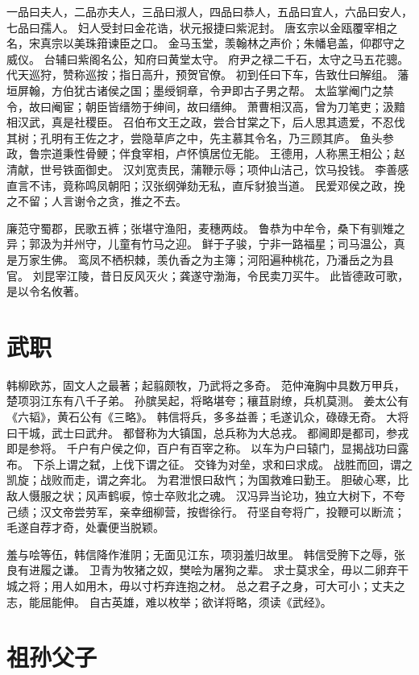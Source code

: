 \documentclass[12pt,UTF8]{ctexbook}
\begin{document}
一品曰夫人，二品亦夫人，三品曰淑人，四品曰恭人，五品曰宜人，六品曰安人，七品曰孺人。
妇人受封曰金花诰，状元报捷曰紫泥封。
唐玄宗以金瓯覆宰相之名，宋真宗以美珠箝谏臣之口。
金马玉堂，羡翰林之声价；朱幡皂盖，仰郡守之威仪。
台辅曰紫阁名公，知府曰黄堂太守。
府尹之禄二千石，太守之马五花骢。
代天巡狩，赞称巡按；指日高升，预贺官僚。
初到任曰下车，告致仕曰解组。
藩垣屏翰，方伯犹古诸侯之国；墨绶铜章，令尹即古子男之帮。
太监掌阉门之禁令，故曰阉宦；朝臣皆缙笏于绅间，故曰缙绅。
萧曹相汉高，曾为刀笔吏；汲黯相汉武，真是社稷臣。
召伯布文王之政，尝合甘棠之下，后人思其遗爱，不忍伐其树；孔明有王佐之才，尝隐草庐之中，先主慕其令名，乃三顾其庐。
鱼头参政，鲁宗道秉性骨鲠；伴食宰相，卢怀慎居位无能。
王德用，人称黑王相公；赵清献，世号铁面御史。
汉刘宽责民，蒲鞭示辱；项仲山洁己，饮马投钱。
李善感直言不讳，竟称鸣凤朝阳；汉张纲弹劾无私，直斥豺狼当道。
民爱邓侯之政，挽之不留；人言谢令之贪，推之不去。

廉范守蜀郡，民歌五裤；张堪守渔阳，麦穗两歧。
鲁恭为中牟令，桑下有驯雉之异；郭汲为并州守，儿童有竹马之迎。
鲜于子骏，宁非一路福星；司马温公，真是万家生佛。
鸾凤不栖枳棘，羡仇香之为主簿；河阳遍种桃花，乃潘岳之为县官。
刘昆宰江陵，昔日反风灭火；龚遂守渤海，令民卖刀买牛。
此皆德政可歌，是以令名攸著。

\chapter{武职}

韩柳欧苏，固文人之最著；起翦颇牧，乃武将之多奇。
范仲淹胸中具数万甲兵，楚项羽江东有八千子弟。
孙膑吴起，将略堪夸；穰苴尉缭，兵机莫测。
姜太公有《六韬》，黄石公有《三略》。
韩信将兵，多多益善；毛遂讥众，碌碌无奇。
大将曰干城，武士曰武弁。
都督称为大镇国，总兵称为大总戎。
都阃即是都司，参戎即是参将。
千户有户侯之仰，百户有百宰之称。
以车为户曰辕门，显揭战功曰露布。
下杀上谓之弑，上伐下谓之征。
交锋为对垒，求和曰求成。
战胜而回，谓之凯旋；战败而走，谓之奔北。
为君泄恨曰敌忾；为国救难曰勤王。
胆破心寒，比敌人慑服之状；风声鹤唳，惊士卒败北之魂。
汉冯异当论功，独立大树下，不夸己绩；汉文帝尝劳军，亲幸细柳营，按辔徐行。
苻坚自夸将广，投鞭可以断流；毛遂自荐才奇，处囊便当脱颖。

羞与哙等伍，韩信降作淮阴；无面见江东，项羽羞归故里。
韩信受胯下之辱，张良有进履之谦。
卫青为牧猪之奴，樊哙为屠狗之辈。
求士莫求全，毋以二卵弃干城之将；用人如用木，毋以寸朽弃连抱之材。
总之君子之身，可大可小；丈夫之志，能屈能伸。
自古英雄，难以枚举；欲详将略，须读《武经》。

\chapter{祖孙父子}
\end{document}
